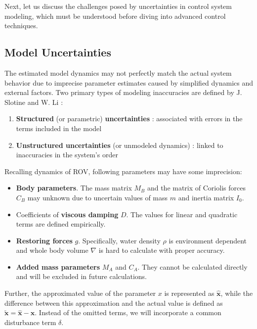     Next, let us discuss the challenges posed by uncertainties in control system modeling, 
    which must be understood before diving into advanced control techniques.

\subsection{Model Uncertainties}

    The estimated model dynamics may not perfectly match the actual system behavior 
    due to imprecise parameter estimates caused by simplified dynamics 
    and external factors. Two primary types of modeling inaccuracies 
    are defined by J. Slotine and W. Li \cite{slotine_applied}:
    \begin{enumerate}
        \item \textbf{Structured} (or parametric) \textbf{uncertainties} : 
        associated with errors in the terms included in the model
        \item \textbf{Unstructured uncertainties} (or unmodeled dynamics) : 
        linked to inaccuracies in the system's order
    \end{enumerate}

    Recalling dynamics of ROV, following parameters may have some imprecision:
    \begin{itemize}
        \item \textbf{Body parameters}. The mass matrix $M_B$ and the matrix of Coriolis forces $C_B$ 
        may unknown due to uncertain values of mass $m$ and inertia matrix $I_0$.
        \item Coefficients of \textbf{viscous damping} $D$. The values for linear and quadratic 
        terms are defined empirically.
        \item \textbf{Restoring forces} $g$. Specifically, water density $\rho$ is environment dependent 
        and whole body volume $\nabla$ is hard to calculate with proper accuracy.
        \item \textbf{Added mass parameters} $M_A$ and $C_A$. They cannot be calculated directly and will 
        be excluded in future calculations.
    \end{itemize}
    Further, the approximated value of the parameter $x$ is represented as $\mathbf{\hat x}$,
    while the difference between this approximation and the actual value is 
    defined as $\mathbf{\tilde x = \hat x - x}$. Instead of the omitted terms, we will incorporate a common disturbance 
    term $\delta$.

